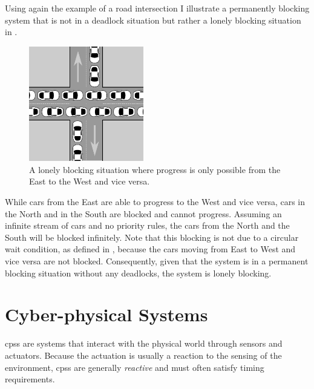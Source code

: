 Using again the example of a road intersection I illustrate a permanently blocking system that is not in a deadlock situation but rather a lonely blocking situation in \Fig{\ref{fig_cross_t}}.
\begin{figure}[bht]
    \TopFigSpace
    \centering
    \includegraphics[width=5cm]{fig/cross_t.pdf}
    \CaptionFigSpace
    \caption{A lonely blocking situation where progress is only possible from the East to the West and vice versa.}
    \label{fig_cross_t}
    \BotFigSpace
\end{figure}
While cars from the East are able to progress to the West and vice versa, cars in the North and in the South are blocked and cannot progress.
Assuming an infinite stream of cars and no priority rules, the cars from the North and the South will be blocked infinitely.
Note that this blocking is not due to a circular wait condition, as defined in , because the cars moving from East to West and vice versa are not blocked.
Consequently, given that the system is in a permanent blocking situation without any deadlocks, the system is lonely blocking.

\section{Cyber-physical Systems}
\label{sect_background_cps}
\Glspl{cps} are systems that interact with the physical world through sensors and actuators.
Because the actuation is usually a reaction to the sensing of the environment, \glspl{cps} are generally \emph{reactive} and must often satisfy timing requirements.

